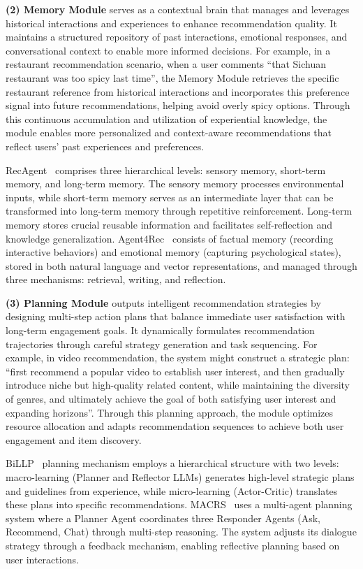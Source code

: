 \textbf{(2) Memory Module} serves as a contextual brain that manages and leverages historical interactions and experiences to enhance recommendation quality. 
It maintains a structured repository of past interactions, emotional responses, and conversational context to enable more informed decisions. 
For example, in a restaurant recommendation scenario, when a user comments ``that Sichuan restaurant was too spicy last time'', the Memory Module retrieves the specific restaurant reference from historical interactions and incorporates this preference signal into future recommendations, helping avoid overly spicy options. 
Through this continuous accumulation and utilization of experiential knowledge, the module enables more personalized and context-aware recommendations that reflect users' past experiences and preferences.

RecAgent~\cite{wang2023user} comprises three hierarchical levels: sensory memory, short-term memory, and long-term memory. The sensory memory processes environmental inputs, while short-term memory serves as an intermediate layer that can be transformed into long-term memory through repetitive reinforcement. Long-term memory stores crucial reusable information and facilitates self-reflection and knowledge generalization.
Agent4Rec~\cite{zhang2024generative} consists of factual memory (recording interactive behaviors) and emotional memory (capturing psychological states), stored in both natural language and vector representations, and managed through three mechanisms: retrieval, writing, and reflection.

\textbf{(3) Planning Module} outputs intelligent recommendation strategies by designing multi-step action plans that balance immediate user satisfaction with long-term engagement goals. 
It dynamically formulates recommendation trajectories through careful strategy generation and task sequencing. 
For example, in video recommendation, the system might construct a strategic plan: ``first recommend a popular video to establish user interest, and then gradually introduce niche but high-quality related content, while maintaining the diversity of genres, and ultimately achieve the goal of both satisfying user interest and expanding horizons''.
Through this planning approach, the module optimizes resource allocation and adapts recommendation sequences to achieve both user engagement and item discovery.

BiLLP~\cite{shi2024large} planning mechanism employs a hierarchical structure with two levels: macro-learning (Planner and Reflector LLMs) generates high-level strategic plans and guidelines from experience, while micro-learning (Actor-Critic) translates these plans into specific recommendations.
MACRS~\cite{fang2024multi} uses a multi-agent planning system where a Planner Agent coordinates three Responder Agents (Ask, Recommend, Chat) through multi-step reasoning. 
The system adjusts its dialogue strategy through a feedback mechanism, enabling reflective planning based on user interactions.




